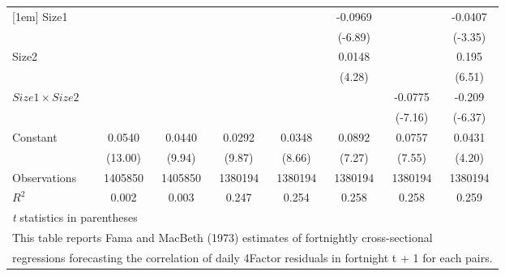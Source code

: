 {\begin{tabular}{l*{7}{c}}
[1em]
Size1               &                     &                     &                     &                     &     -0.0969\sym{***}&                     &     -0.0407\sym{***}\\
                    &                     &                     &                     &                     &     (-6.89)         &                     &     (-3.35)         \\
[1em]
Size2               &                     &                     &                     &                     &      0.0148\sym{***}&                     &       0.195\sym{***}\\
                    &                     &                     &                     &                     &      (4.28)         &                     &      (6.51)         \\
[1em]
$ Size1 \times Size2 $&                     &                     &                     &                     &                     &     -0.0775\sym{***}&      -0.209\sym{***}\\
                    &                     &                     &                     &                     &                     &     (-7.16)         &     (-6.37)         \\
[1em]
Constant            &      0.0540\sym{***}&      0.0440\sym{***}&      0.0292\sym{***}&      0.0348\sym{***}&      0.0892\sym{***}&      0.0757\sym{***}&      0.0431\sym{***}\\
                    &     (13.00)         &      (9.94)         &      (9.87)         &      (8.66)         &      (7.27)         &      (7.55)         &      (4.20)         \\
\hline
Observations        &     1405850         &     1405850         &     1380194         &     1380194         &     1380194         &     1380194         &     1380194         \\
\(R^{2}\)           &       0.002         &       0.003         &       0.247         &       0.254         &       0.258         &       0.258         &       0.259         \\
\hline\hline
\multicolumn{8}{l}{\footnotesize \textit{t} statistics in parentheses}\\
\multicolumn{8}{l}{\footnotesize This table reports Fama and MacBeth (1973) estimates of fortnightly cross-sectional}\\
\multicolumn{8}{l}{\footnotesize  regressions forecasting the correlation of daily 4Factor residuals in fortnight t + 1 for each pairs.}\\

\end{tabular}}
